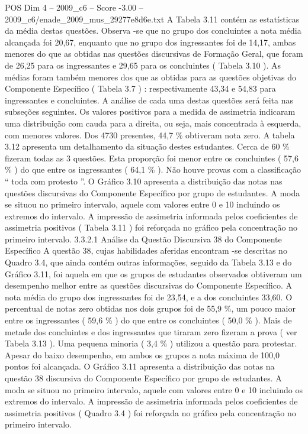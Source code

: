\begin{textsample}{POS Dim 4 – 2009\_c6 – Score -3.00 – 2009\_c6/enade\_2009\_mus\_29277e8d6e.txt}
A Tabela 3.11 contém as estatísticas da média destas questões.
Observa -se que no grupo dos concluintes a nota média alcançada foi 20,67, enquanto que no grupo dos ingressantes foi de 14,17, ambas menores do que as obtidas nas questões discursivas de Formação Geral, que foram de 26,25 para os ingressantes e 29,65 para os concluintes ( Tabela 3.10 ).
As médias foram também menores dos que as obtidas para as questões objetivas do Componente Específico ( Tabela 3.7 ) : respectivamente 43,34 e 54,83 para ingressantes e concluintes.
A análise de cada uma destas questões será feita nas subseções seguintes.
Os valores positivos para a medida de assimetria indicaram uma distribuição com cauda para a direita, ou seja, mais concentrada à esquerda, com menores valores.
Dos 4730 presentes, 44,7 \% obtiveram nota zero.
A tabela 3.12 apresenta um detalhamento da situação destes estudantes.
Cerca de 60 \% fizeram todas as 3 questões.
Esta proporção foi menor entre os concluintes ( 57,6 \% ) do que entre os ingressantes ( 64,1 \% ).
Não houve provas com a classificação “ toda com protesto ”.
O Gráfico 3.10 apresenta a distribuição das notas nas questões discursivas do Componente Específico por grupo de estudantes.
A moda se situou no primeiro intervalo, aquele com valores entre 0 e 10 incluindo os extremos do intervalo.
A impressão de assimetria informada pelos coeficientes de assimetria positivos ( Tabela 3.11 ) foi reforçada no gráfico pela concentração no primeiro intervalo. 3.3.2.1 Análise da Questão Discursiva 38 do Componente Específico A questão 38, cujas habilidades aferidas encontram -se descritas no Quadro 3.4, que ainda contém outras informações, seguido da Tabela 3.13 e do Gráfico 3.11, foi aquela em que os grupos de estudantes observados obtiveram um desempenho melhor entre as questões discursivas do Componente Específico.
A nota média do grupo dos ingressantes foi de 23,54, e a dos concluintes 33,60.
O percentual de notas zero obtidas nos dois grupos foi de 55,9 \%, um pouco maior entre os ingressantes ( 59,6 \% ) do que entre os concluintes ( 50,0 \% ).
Mais de metade dos concluintes e dos ingressantes que tiraram zero fizeram a prova ( ver Tabela 3.13 ).
Uma pequena minoria ( 3,4 \% ) utilizou a questão para protestar.
Apesar do baixo desempenho, em ambos os grupos a nota máxima de 100,0 pontos foi alcançada.
O Gráfico 3.11 apresenta a distribuição das notas na questão 38 discursiva do Componente Específico por grupo de estudantes.
A moda se situou no primeiro intervalo, aquele com valores entre 0 e 10 incluindo os extremos do intervalo.
A impressão de assimetria informada pelos coeficientes de assimetria positivos ( Quadro 3.4 ) foi reforçada no gráfico pela concentração no primeiro intervalo.

\end{textsample}
